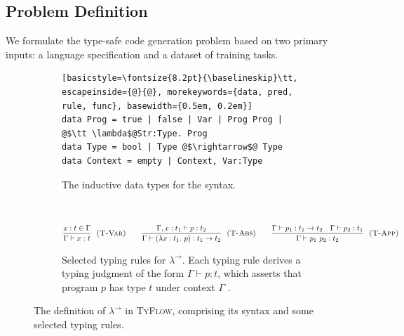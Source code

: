 \documentclass[manuscript,screen]{acmart}
\newcommand{\stlctype}[3]{{#1} \vdash {#2} : {#3}}
\newcommand{\toolname}[1]{\textsc{#1}}
\newcommand{\scode}[1]{{\fontsize{8.2pt}{\baselineskip}\tt \texttt{\spaceskip=0.15em #1}}}
\newcommand{\mainname}{\toolname{TyFlow}\xspace}
\newcommand{\stlc}{\lambda^{\rightarrow}}
\begin{document}
\subsection{Problem Definition} \label{subsection:moti-problem}
We formulate the type-safe code generation problem based on two primary inputs: a language specification and a dataset of training tasks.

\newcommand{\checkBinding}[3]{\ensuremath{{#2}:{#3} \in {#1}}}
\newcommand{\abs}[3]{\ensuremath{\lambda {#1}:{#2}.\ {#3}}}
\newcommand{\vari}[1]{\ensuremath{{#1}}}
\newcommand{\snoc}[3]{\ensuremath{{#1}, {#2}:{#3}}}
\newcommand{\arr}[2]{\ensuremath{{#1}\rightarrow {#2}}}
\newcommand{\app}[2]{\ensuremath{{#1}\ {#2}}}
\newcommand{\rulename}[1]{\textsc{#1}}

\begin{figure}[t]
\hfill
\begin{subfigure}{0.65\textwidth}
\begin{lstlisting}[basicstyle=\fontsize{8.2pt}{\baselineskip}\tt, escapeinside={@}{@}, morekeywords={data, pred, rule, func}, basewidth={0.5em, 0.2em}] 
data Prog = true | false | Var | Prog Prog | @$\tt \lambda$@Str:Type. Prog
data Type = bool | Type @$\rightarrow$@ Type      
data Context = empty | Context, Var:Type
\end{lstlisting}
\vspace{-0.5em}
\caption{The inductive data types for the syntax.} \label{figure:stlc-syntax}
\end{subfigure}
\hfill\ 

\vspace{1em}

\begin{subfigure}{0.8\textwidth}
\small

\begin{gather*}
\frac{\checkBinding{\Gamma}{x}{t}}{\stlctype{\Gamma}{\vari x}{t}} \ \ \textsc{(T-Var)} \qquad
\frac{\stlctype{\snoc{\Gamma}{x}{t_1}}{p}{t_2}}{\stlctype{\Gamma}{\left(\abs{x}{t_1}{p}\right)}{\arr{t_1}{ t_2}}} \ \ \textsc{(T-Abs)} \qquad
\frac{\stlctype{\Gamma}{p_1}{\arr{t_1}{t_2}} \quad \stlctype{\Gamma}{p_2}{t_1}}{\stlctype{\Gamma}{\app{p_1}{p_2}}{t_2}} \ \ \textsc{(T-App)} \qquad
\end{gather*}
\vspace{-0.5em}
\caption{Selected typing rules for $\stlc$. Each typing rule derives a typing judgment of the form $\stlctype{\Gamma}{p}{t}$, which asserts that program $p$ has type $t$ under context $\Gamma$ {\color{revblue}.} } 
    \label{figure:stlc-rules}
\end{subfigure}
\vspace{-0.5em}
\caption{The definition of $\stlc$ in \mainname, comprising its syntax and some selected typing rules.
  }
\label{figure:stlc-definition}
\end{figure}
\end{document}
